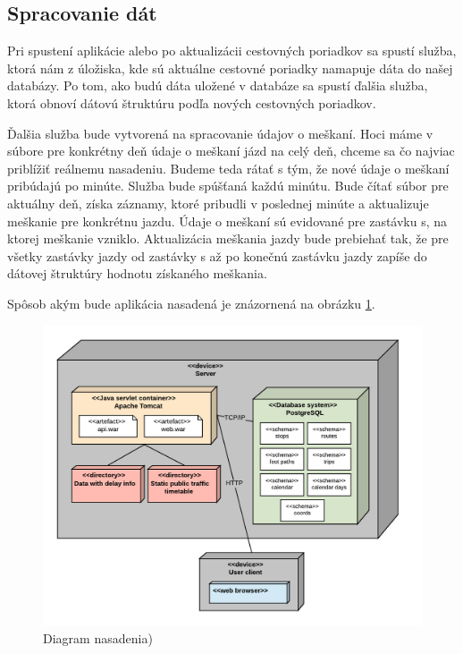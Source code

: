 \subsection{Spracovanie dát}
Pri spustení aplikácie alebo po aktualizácii cestovných poriadkov sa spustí služba, ktorá nám z úložiska, kde sú aktuálne cestovné poriadky namapuje dáta do našej databázy. Po tom, ako budú dáta uložené v databáze sa spustí ďalšia služba, ktorá obnoví dátovú štruktúru podľa nových cestovných poriadkov. 

Ďalšia služba bude vytvorená na spracovanie údajov o meškaní. Hoci máme v súbore pre konkrétny deň údaje o meškaní jázd na celý deň, chceme sa čo najviac priblížiť reálnemu nasadeniu. Budeme teda rátať s tým, že nové údaje o meškaní pribúdajú po minúte. Služba bude spúšťaná každú minútu. Bude čítať súbor pre aktuálny deň, získa záznamy, ktoré pribudli v poslednej minúte a aktualizuje meškanie pre konkrétnu jazdu. Údaje o meškaní sú evidované pre zastávku s, na ktorej meškanie vzniklo. Aktualizácia meškania jazdy bude prebiehať tak, že pre všetky zastávky jazdy od zastávky s až po konečnú zastávku jazdy zapíše do dátovej štruktúry hodnotu získaného meškania.

Spôsob akým bude aplikácia nasadená je znázornená na obrázku \ref{fig:deploymentDiagram}.

\begin{figure}[H]
\centerline{\includegraphics[width=1.0\textwidth]{images/deployment-diagram}}
\caption[Diagram nasadenia]{Diagram nasadenia)}
\label{fig:deploymentDiagram}
\end{figure}



